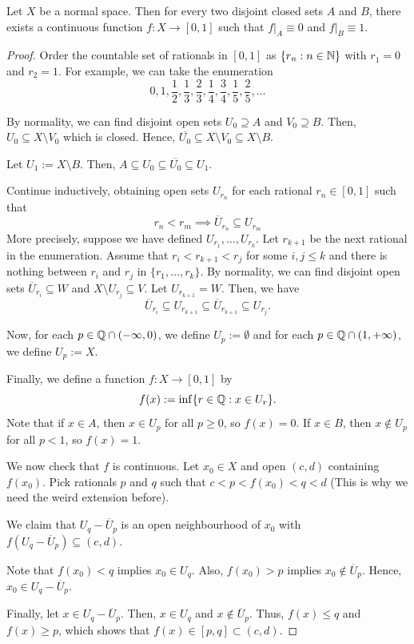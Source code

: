 \begin{lemma}

    Let $X$ be a normal space. Then for every two disjoint closed sets $A$ and $B$, there exists a continuous function $f:X\to[0,1]$ such that $f|_A\equiv0$ and $f|_B\equiv1$.
    
\end{lemma}
\begin{proof}
    Order the countable set of rationals in $[0,1]$ as $\{r_n:n\in\mathbb{N}\}$ with $r_1=0$ and $r_2=1$. For example, we can take the enumeration
    \[0,1,\frac{1}{2},\frac{1}{3},\frac{2}{3},\frac{1}{4},\frac{3}{4},\frac{1}{5},\frac{2}{5},\ldots\]

    By normality, we can find disjoint open sets $U_0\supseteq A$ and $V_0\supseteq B$. Then, $U_0\subseteq X\setminus V_0$ which is closed. Hence, $\overline{U_0}\subseteq X\setminus V_0\subseteq X\setminus B$.

    Let $U_1:=X\setminus B$. Then, $A\subseteq U_0\subseteq\overline{U_0}\subseteq U_1$.  

    Continue inductively, obtaining open sets $U_{r_n}$ for each rational $r_n\in[0,1]$ such that
    \[r_n<r_m\implies \overline{U}_{r_n}\subseteq U_{r_m}\] 
    More precisely, suppose we have defined $U_{r_1},\ldots,U_{r_k}$. Let $r_{k+1}$ be the next rational in the enumeration. Assume that $r_i<r_{k+1}<r_j$ for some $i,j\le k$ and there is nothing between $r_i$ and $r_j$ in $\{r_1,\ldots,r_k\}$. By normality, we can find disjoint open sets $\overline{U}_{r_i}\subseteq W$ and $X\setminus U_{r_j}\subseteq V$. Let $U_{r_{k+1}}=W$. Then, we have
    \[\overline{U}_{r_i}\subseteq U_{r_{k+1}}\subseteq\overline{U}_{r_{k+1}}\subseteq U_{r_j}.\]

    Now, for each $p\in \mathbb{Q}\cap (-\infty,0)$, we define $U_p:=\emptyset$ and for each $p\in \mathbb{Q}\cap(1,+\infty)$, we define $U_p:=X$. 

    Finally, we define a function $f:X\to[0,1]$ by
    \[f(x):=\inf\{r\in\mathbb{Q}: x\in U_r\}.\]
    Note that if $x\in A$, then $x\in U_p$ for all $p\geq 0$, so $f(x)=0$. If $x\in B$, then $x\notin U_p$ for all $p<1$, so $f(x)=1$.

    We now check that $f$ is continuous. Let $x_0\in X$ and open $(c,d)$ containing $f(x_0)$. Pick rationals $p$ and $q$ such that $c<p<f(x_0)<q<d$ (This is why we need the weird extension before).

    We claim that $U_q-\overline{U}_p$ is an open neighbourhood of $x_0$ with $f(U_q-\overline{U}_p)\subseteq (c,d)$.

    Note that $f(x_0)<q$ implies $x_0\in U_q$. Also, $f(x_0)>p$ implies $x_0\notin \overline{U}_p$. Hence, $x_0\in U_q-\overline{U}_p$.

    Finally, let $x\in U_q-\overline{U}_p$. Then, $x\in U_q$ and $x\notin \overline{U}_p$. Thus, $f(x)\leq q$ and $f(x)\geq p$, which shows that $f(x)\in [p,q]\subset (c,d)$.
\end{proof}


